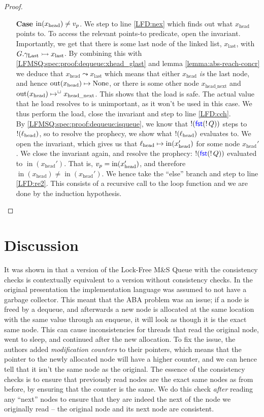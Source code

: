 \documentclass[a4paper, 10pt]{report}
\theoremstyle{definition}
\newcommand{\msq}{M\&S Queue}
\newcommand{\lfmsq}{Lock-Free \msq{}}
\newcommand{\locN}[1]{\loc_{\mathrm{#1}}}
\newcommand{\lochead}{\locN{head}}
\newcommand{\nIn}[1]{\operatorname{in}(#1)}
\newcommand{\nOut}[1]{\operatorname{out}(#1)}
\newcommand{\node}{x}
\newcommand{\nodeN}[1]{\node_{\mathrm{#1}}}
\newcommand{\nodehead}{\nodeN{head}}
\newcommand{\nodelast}{\nodeN{last}}
\newcommand{\nodeheadnext}{\nodeN{head\_next}}
\newcommand{\prophval}{\val_p}
\newcommand{\Qg}{G}
\newcommand{\glast}{\gname_{\mathrm{Last}}}
\newcommand{\reach}[2]{#1 \leadsto #2}
\newcommand{\ap}[2]{#1 \rightarrowtail #2}
\begin{document}
\begin{proof}
\begin{itemize}
    \item[\textbf{Case}] $\nIn{\nodehead} \neq \prophval$.
    We step to line \ref{LFD:nex} which finds out what $\nodehead$ points to. To access the relevant points-to predicate, open the invariant. Importantly, we get that there is some last node of the linked list, $\nodelast$, with $\ap{\Qg.\glast}{\nodelast}$. By combining this with \ref{LFMSQ:spec:proof:dequeue:xhead_glast} and lemma \ref{lemma:abs-reach-concr} we deduce that $\reach{\nodehead}{\nodelast}$ which means that either $\nodehead$ \textit{is} the last node, and hence $\nOut{\nodehead} \mapsto \None$, or there is some other node $\nodeheadnext$ and $\nOut{\nodehead} \mapsto^{\persistently} \nodeheadnext$. This shows that the load is safe. The actual value that he load resolves to is unimportant, as it won't be used in this case. We thus perform the load, close the invariant and step to line \ref{LFD:cch}.\\
    By \ref{LFMSQ:spec:proof:dequeue:isqueue}, we know that $\mathop{!}(\operatorname{\textsf{\color{blue} fst}} (\mathop{!} Q))$ steps to $\deref(\lochead)$, so to resolve the prophecy, we show what $\deref(\lochead)$ evaluates to. We open the invariant, which gives us that $\lochead \mapsto \nIn{\nodehead'}$ for some node $\nodehead'$. We close the invariant again, and resolve the prophecy: $\mathop{!}(\operatorname{\textsf{\color{blue} fst}} (\mathop{!} Q))$ evaluated to $\nIn{\nodehead'}$. That is, $\prophval = \nIn{\nodehead'}$, and therefore $\nIn{\nodehead} \neq \nIn{\nodehead'}$. We hence take the ``else'' branch and step to line \ref{LFD:re2}. This consists of a recursive call to the loop function and we are done by the induction hypothesis.
  \end{itemize}
\end{proof}


\section{Discussion}
\label{LFMSQ:section:discussion}

It was shown in \citet{DBLP:conf/cpp/VindumB21} that a version of the \lfmsq{} with the consistency checks is contextually equivalent to a version without consistency checks. In the original presentation \citep{DBLP:conf/podc/MichaelS96} the implementation language was assumed to not have a garbage collector. This meant that the ABA problem was an issue; if a node is freed by a dequeue, and afterwards a new node is allocated at the same location with the same value through an enqueue, it will look as though it is the exact same node. This can cause inconsistencies for threads that read the original node, went to sleep, and continued after the new allocation. 
To fix the issue, the authors added \textit{modification counters} to their pointers, which means that the pointer to the newly allocated node will have a higher counter, and we can hence tell that it isn't the same node as the original. The essence of the consistency checks is to ensure that previously read nodes are the exact same nodes as from before, by ensuring that the counter is the same.
We do this check \textit{after} reading any ``next'' nodes to ensure that they are indeed the next of the node we originally read -- the original node and its next node are consistent.
\end{document}
